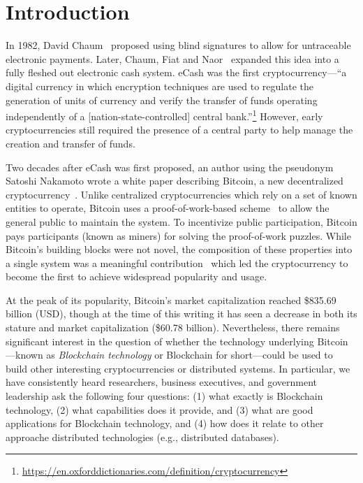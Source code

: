 
\section{Introduction}

In 1982, David Chaum~\cite{Cha82} proposed using blind signatures to allow for untraceable electronic payments.
Later, Chaum, Fiat and Naor~\cite{chaum1988untraceable} expanded this idea into a fully fleshed out electronic cash system.
eCash was the first cryptocurrency---\ie ``a digital currency in which encryption techniques are used to regulate the generation of units of currency and verify the transfer of funds operating independently of a [nation-state-controlled] central bank.''\footnote{\url{https://en.oxforddictionaries.com/definition/cryptocurrency}}
However, early cryptocurrencies still required the presence of a central party to help manage the creation and transfer of funds.

Two decades after eCash was first proposed, an author using the pseudonym Satoshi Nakamoto wrote a white paper describing Bitcoin, a new decentralized cryptocurrency~\cite{Nak08}.
Unlike centralized cryptocurrencies which rely on a set of known entities to operate, Bitcoin uses a proof-of-work-based scheme~\cite{DN93,back1997partial} to allow the general public to maintain the system.
To incentivize public participation, Bitcoin pays participants (known as miners) for solving the proof-of-work puzzles.
While Bitcoin's building blocks were not novel, the composition of these properties into a single system was a meaningful contribution~\cite{Narayanan17} which led the cryptocurrency to become the first to achieve widespread popularity and usage.

At the peak of its popularity, Bitcoin's market capitalization reached \$835.69 billion (USD), though at the time of this writing it has seen a decrease in both its stature and market capitalization (\$60.78 billion).
Nevertheless, there remains significant interest in the question of whether the technology underlying Bitcoin---known as \emph{Blockchain technology} or {Blockchain} for short---could be used to build other interesting cryptocurrencies or distributed systems.
In particular, we have consistently heard researchers, business executives, and government leadership ask the following four questions: (1) what exactly is Blockchain technology, (2) what capabilities does it provide, and (3) what are good applications for Blockchain technology, and (4) how does it relate to other approache distributed technologies (e.g., distributed databases).

